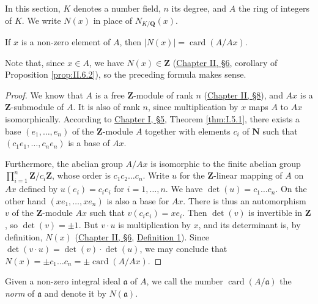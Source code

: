 
In this section, $K$ denotes a number field, $n$ its degree, and $A$ the ring
of integers of $K$. We write $N(x)$ in place of $N_{K/\mathbf{Q}}(x)$.

\begin{proposition}
\label{prop:III.5.1}
If $x$ is a non-zero element of $A$, then
$|N(x)|=\operatorname{card}(A/Ax)$.
\end{proposition}

Note that, since $x\in A$, we have $N(x)\in\mathbf{Z}$ (\hyperref[sec:2.6]{Chapter II, §6},
corollary of Proposition \ref{prop:II.6.2}), so the preceding formula makes
sense.

\begin{proof}
We know that $A$ is a free $\mathbf{Z}$-module of rank $n$ (\hyperref[sec:2.8]{Chapter II, §8}),
and $Ax$ is a $\mathbf{Z}$-submodule of $A$. It is also of rank $n$, since
multiplication by $x$ maps $A$ to $Ax$ isomorphically. According to \hyperref[sec:1.5]{Chapter
I, §5}, Theorem \ref{thm:I.5.1}, there exists a base $(e_{1},\ldots,e_{n})$ of
the $\mathbf{Z}$-module $A$ together with elements $c_{i}$ of $\mathbf{N}$
such that $(c_{1}e_{1},\ldots,c_{n}e_{n})$ is a base of $Ax$.

Furthermore, the abelian group $A/Ax$ is isomorphic to the finite abelian
group $\prod_{i=1}^{n}\mathbf{Z}/c_{i}\mathbf{Z}$, whose order is
$c_{1}c_{2}\ldots c_{n}$. Write $u$ for the $\mathbf{Z}$-linear mapping of
$A$ on $Ax$ defined by $u(e_{i})=c_{i}e_{i}$ for $i=1,\ldots,n$. We have
$\det(u)=c_{1}\ldots c_{n}$. On the other hand $(xe_{1},\ldots,xe_{n})$ is
also a base for $Ax$. There is thus an automorphism $v$ of the
$\mathbf{Z}$-module $Ax$ such that $v(c_{i}e_{i})=xe_{i}$. Then $\det(v)$ is
invertible in $\mathbf{Z}$, so $\det(v)=\pm1$. But $v\cdot u$ is
multiplication by $x$, and its determinant is, by definition, $N(x)$
(\hyperref[sec:2.6]{Chapter II, §6}, \hyperref[def:II.6.1]{Definition 1}). Since $\det(v\cdot u)=\det(v)\cdot\det(u)$, we may conclude that
$N(x)=\pm c_{1}\ldots c_{n}=\pm\operatorname{card}(A/Ax)$.
\end{proof}

\begin{definition}\label{def:III.5.1}
Given a non-zero integral ideal $\mathfrak{a}$ of $A$, we call the number
$\operatorname{card}(A/\mathfrak{a})$ the \emph{norm} of $\mathfrak{a}$ and
denote it by $N(\mathfrak{a})$.
\end{definition}

